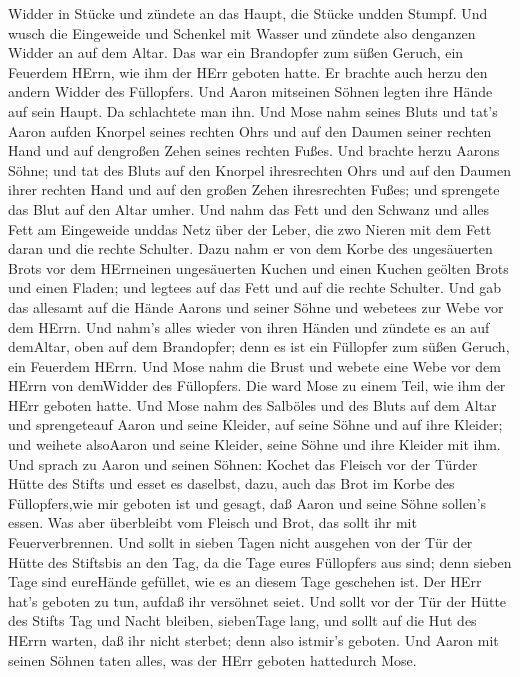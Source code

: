 Widder in Stücke und zündete an das Haupt, die Stücke undden Stumpf.
 Und wusch die Eingeweide und Schenkel mit Wasser und
zündete also denganzen Widder an auf dem Altar. Das war ein Brandopfer
zum süßen Geruch, ein Feuerdem HErrn, wie ihm der HErr geboten hatte.
 Er brachte auch herzu den andern Widder des Füllopfers.
Und Aaron mitseinen Söhnen legten ihre Hände auf sein Haupt.
 Da schlachtete man ihn. Und Mose nahm seines Bluts und
tat's Aaron aufden Knorpel seines rechten Ohrs und auf den Daumen seiner
rechten Hand und auf dengroßen Zehen seines rechten Fußes. 
Und brachte herzu Aarons Söhne; und tat des Bluts auf den Knorpel
ihresrechten Ohrs und auf den Daumen ihrer rechten Hand und auf den
großen Zehen ihresrechten Fußes; und sprengete das Blut auf den Altar
umher.  Und nahm das Fett und den Schwanz und alles Fett am
Eingeweide unddas Netz über der Leber, die zwo Nieren mit dem Fett daran
und die rechte Schulter.  Dazu nahm er von dem Korbe des
ungesäuerten Brots vor dem HErrneinen ungesäuerten Kuchen und einen
Kuchen geölten Brots und einen Fladen; und legtees auf das Fett und auf
die rechte Schulter.  Und gab das allesamt auf die Hände
Aarons und seiner Söhne und webetees zur Webe vor dem HErrn.
 Und nahm's alles wieder von ihren Händen und zündete es an
auf demAltar, oben auf dem Brandopfer; denn es ist ein Füllopfer zum
süßen Geruch, ein Feuerdem HErrn.  Und Mose nahm die Brust
und webete eine Webe vor dem HErrn von demWidder des Füllopfers. Die
ward Mose zu einem Teil, wie ihm der HErr geboten hatte. 
Und Mose nahm des Salböles und des Bluts auf dem Altar und sprengeteauf
Aaron und seine Kleider, auf seine Söhne und auf ihre Kleider; und
weihete alsoAaron und seine Kleider, seine Söhne und ihre Kleider mit
ihm.  Und sprach zu Aaron und seinen Söhnen: Kochet das
Fleisch vor der Türder Hütte des Stifts und esset es daselbst, dazu,
auch das Brot im Korbe des Füllopfers,wie mir geboten ist und gesagt,
daß Aaron und seine Söhne sollen's essen.  Was aber
überbleibt vom Fleisch und Brot, das sollt ihr mit Feuerverbrennen.
 Und sollt in sieben Tagen nicht ausgehen von der Tür der
Hütte des Stiftsbis an den Tag, da die Tage eures Füllopfers aus sind;
denn sieben Tage sind eureHände gefüllet,  wie es an diesem
Tage geschehen ist. Der HErr hat's geboten zu tun, aufdaß ihr versöhnet
seiet.  Und sollt vor der Tür der Hütte des Stifts Tag und
Nacht bleiben, siebenTage lang, und sollt auf die Hut des HErrn warten,
daß ihr nicht sterbet; denn also istmir's geboten.  Und
Aaron mit seinen Söhnen taten alles, was der HErr geboten hattedurch
Mose.

